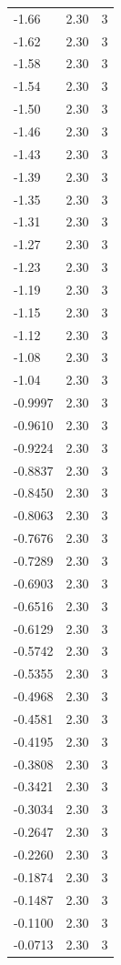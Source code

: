 \begin{longtable}{lrr}
  -1.66 & 2.30 & 3 \\
  -1.62 & 2.30 & 3 \\
  -1.58 & 2.30 & 3 \\
  -1.54 & 2.30 & 3 \\
  -1.50 & 2.30 & 3 \\
  -1.46 & 2.30 & 3 \\
  -1.43 & 2.30 & 3 \\
  -1.39 & 2.30 & 3 \\
  -1.35 & 2.30 & 3 \\
  -1.31 & 2.30 & 3 \\
  -1.27 & 2.30 & 3 \\
  -1.23 & 2.30 & 3 \\
  -1.19 & 2.30 & 3 \\
  -1.15 & 2.30 & 3 \\
  -1.12 & 2.30 & 3 \\
  -1.08 & 2.30 & 3 \\
  -1.04 & 2.30 & 3 \\
  -0.9997 & 2.30 & 3 \\
  -0.9610 & 2.30 & 3 \\
  -0.9224 & 2.30 & 3 \\
  -0.8837 & 2.30 & 3 \\
  -0.8450 & 2.30 & 3 \\
  -0.8063 & 2.30 & 3 \\
  -0.7676 & 2.30 & 3 \\
  -0.7289 & 2.30 & 3 \\
  -0.6903 & 2.30 & 3 \\
  -0.6516 & 2.30 & 3 \\
  -0.6129 & 2.30 & 3 \\
  -0.5742 & 2.30 & 3 \\
  -0.5355 & 2.30 & 3 \\
  -0.4968 & 2.30 & 3 \\
  -0.4581 & 2.30 & 3 \\
  -0.4195 & 2.30 & 3 \\
  -0.3808 & 2.30 & 3 \\
  -0.3421 & 2.30 & 3 \\
  -0.3034 & 2.30 & 3 \\
  -0.2647 & 2.30 & 3 \\
  -0.2260 & 2.30 & 3 \\
  -0.1874 & 2.30 & 3 \\
  -0.1487 & 2.30 & 3 \\
  -0.1100 & 2.30 & 3 \\
  -0.0713 & 2.30 & 3 \\

\end{longtable}
